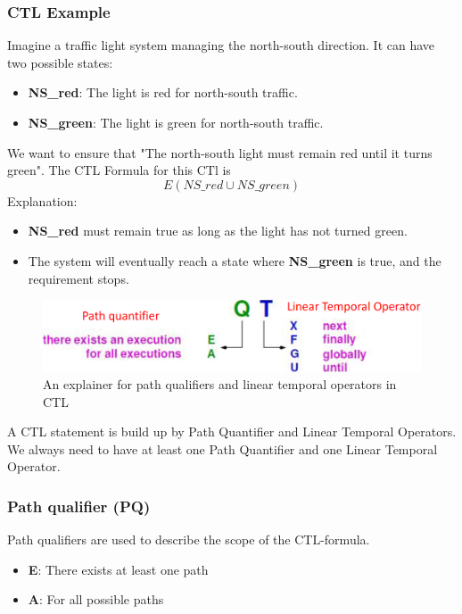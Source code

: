 \subsubsection{CTL Example}
Imagine a traffic light system managing the north-south direction. It can have two possible states:
\begin{itemize}
    \item \textbf{NS\_red}: The light is red for north-south traffic.
    \item \textbf{NS\_green}: The light is green for north-south traffic.
\end{itemize}
We want to ensure that "The north-south light must remain red until it turns green".
The CTL Formula for this CTl is
\begin{equation*}
    E (NS\_red \cup NS\_green)
\end{equation*}
Explanation:
\begin{itemize}
    \item \textbf{NS\_red} must remain true as long as the light has not turned green. 
    \item The system will eventually reach a state where \textbf{NS\_green} is true, and the requirement stops.
\end{itemize}



\begin{figure}[H]
    \centering
    \caption{An explainer for path qualifiers and linear temporal operators in CTL}
    \label{fig:ctl-pq_and_lto_cheatsheet}
    \includegraphics[width=1\linewidth]{images/ctl-notatio_explainer.png}
\end{figure}

A CTL statement is build up by Path Quantifier and Linear Temporal Operators. We always need to have at least one Path Quantifier and one Linear Temporal Operator. 


\subsubsection{Path qualifier (PQ)}
Path qualifiers are used to describe the scope of the CTL-formula. %
\begin{itemize}
    \item \textbf{E}: There exists at least one path
    \item \textbf{A}: For all possible paths
\end{itemize}

